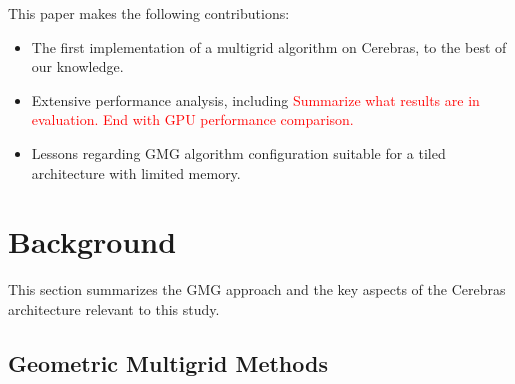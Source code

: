 \documentclass[sigconf]{acmart}
\begin{document}
This paper makes the following contributions:
\begin{itemize}
\item The first implementation of a multigrid algorithm on Cerebras, to the best of our knowledge.
\item Extensive performance analysis, including \textcolor{red}{Summarize what results are in evaluation.  End with GPU performance comparison.}%
\item Lessons regarding GMG algorithm configuration suitable for a tiled architecture with limited memory.
\end{itemize}



\section{Background}
This section summarizes the GMG approach and the key aspects of the Cerebras architecture relevant to this study.

\subsection{Geometric Multigrid Methods}
\end{document}
